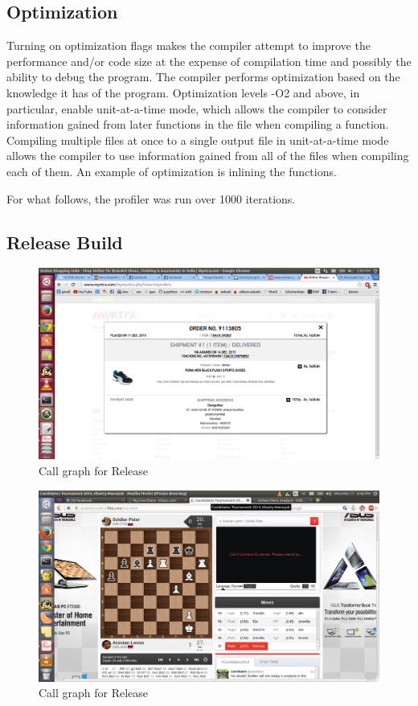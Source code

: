 \documentclass[11pt]{article}
\begin{document}
\subsection{Optimization}
Turning on optimization flags makes the compiler attempt to improve the performance and/or code size at the expense of compilation time and possibly the ability to debug the program. The compiler performs optimization based on the knowledge it has of the program. Optimization levels -O2 and above, in particular, enable unit-at-a-time mode, which allows the compiler to consider information gained from later functions in the file when compiling a function. Compiling multiple files at once to a single output file in unit-at-a-time mode allows the compiler to use information gained from all of the files when compiling each of them. An example of optimization is inlining the functions.

For what follows, the profiler was run over 1000 iterations.

\subsection{Release Build}


\begin{figure}[ht!]
\centering
\includegraphics[width=150mm]{g32_release_prof.png}
\caption{Call graph for Release}
\label{overflow}
\end{figure}

\begin{figure}[ht!]
\centering
\includegraphics[width=150mm]{release.png}
\caption{Call graph for Release}
\label{overflow}
\end{figure}
\end{document}
